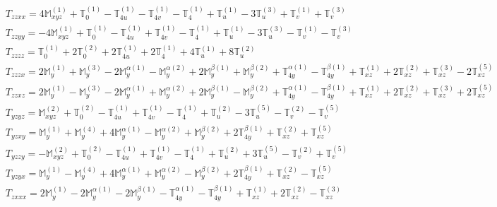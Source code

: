 \documentclass[fleqn,8pt,landscape]{jsarticle}
\begin{document}
\begin{align*}
& T_{zzxx} = 4 \mathbb{M}_{xyz}^{(1)} + \mathbb{T}_{0}^{(1)} - \mathbb{T}_{4u}^{(1)} - \mathbb{T}_{4v}^{(1)} - \mathbb{T}_{4}^{(1)} + \mathbb{T}_{u}^{(1)} - 3 \mathbb{T}_{u}^{(3)} + \mathbb{T}_{v}^{(1)} + \mathbb{T}_{v}^{(3)} \\
& T_{zzyy} = - 4 \mathbb{M}_{xyz}^{(1)} + \mathbb{T}_{0}^{(1)} - \mathbb{T}_{4u}^{(1)} + \mathbb{T}_{4v}^{(1)} - \mathbb{T}_{4}^{(1)} + \mathbb{T}_{u}^{(1)} - 3 \mathbb{T}_{u}^{(3)} - \mathbb{T}_{v}^{(1)} - \mathbb{T}_{v}^{(3)} \\
& T_{zzzz} = \mathbb{T}_{0}^{(1)} + 2 \mathbb{T}_{0}^{(2)} + 2 \mathbb{T}_{4u}^{(1)} + 2 \mathbb{T}_{4}^{(1)} + 4 \mathbb{T}_{u}^{(1)} + 8 \mathbb{T}_{u}^{(2)} \\
& T_{zzzx} = 2 \mathbb{M}_{y}^{(1)} + \mathbb{M}_{y}^{(3)} - 2 \mathbb{M}_{y}^{\alpha(1)} - \mathbb{M}_{y}^{\alpha(2)} + 2 \mathbb{M}_{y}^{\beta(1)} + \mathbb{M}_{y}^{\beta(2)} + \mathbb{T}_{4y}^{\alpha(1)} - \mathbb{T}_{4y}^{\beta(1)} + \mathbb{T}_{xz}^{(1)} + 2 \mathbb{T}_{xz}^{(2)} + \mathbb{T}_{xz}^{(3)} - 2 \mathbb{T}_{xz}^{(5)} \\
& T_{zzxz} = 2 \mathbb{M}_{y}^{(1)} - \mathbb{M}_{y}^{(3)} - 2 \mathbb{M}_{y}^{\alpha(1)} + \mathbb{M}_{y}^{\alpha(2)} + 2 \mathbb{M}_{y}^{\beta(1)} - \mathbb{M}_{y}^{\beta(2)} + \mathbb{T}_{4y}^{\alpha(1)} - \mathbb{T}_{4y}^{\beta(1)} + \mathbb{T}_{xz}^{(1)} + 2 \mathbb{T}_{xz}^{(2)} + \mathbb{T}_{xz}^{(3)} + 2 \mathbb{T}_{xz}^{(5)} \\
& T_{yzyz} = \mathbb{M}_{xyz}^{(2)} + \mathbb{T}_{0}^{(2)} - \mathbb{T}_{4u}^{(1)} + \mathbb{T}_{4v}^{(1)} - \mathbb{T}_{4}^{(1)} + \mathbb{T}_{u}^{(2)} - 3 \mathbb{T}_{u}^{(5)} - \mathbb{T}_{v}^{(2)} - \mathbb{T}_{v}^{(5)} \\
& T_{yzxy} = \mathbb{M}_{y}^{(1)} + \mathbb{M}_{y}^{(4)} + 4 \mathbb{M}_{y}^{\alpha(1)} - \mathbb{M}_{y}^{\alpha(2)} + \mathbb{M}_{y}^{\beta(2)} + 2 \mathbb{T}_{4y}^{\beta(1)} + \mathbb{T}_{xz}^{(2)} + \mathbb{T}_{xz}^{(5)} \\
& T_{yzzy} = - \mathbb{M}_{xyz}^{(2)} + \mathbb{T}_{0}^{(2)} - \mathbb{T}_{4u}^{(1)} + \mathbb{T}_{4v}^{(1)} - \mathbb{T}_{4}^{(1)} + \mathbb{T}_{u}^{(2)} + 3 \mathbb{T}_{u}^{(5)} - \mathbb{T}_{v}^{(2)} + \mathbb{T}_{v}^{(5)} \\
& T_{yzyx} = \mathbb{M}_{y}^{(1)} - \mathbb{M}_{y}^{(4)} + 4 \mathbb{M}_{y}^{\alpha(1)} + \mathbb{M}_{y}^{\alpha(2)} - \mathbb{M}_{y}^{\beta(2)} + 2 \mathbb{T}_{4y}^{\beta(1)} + \mathbb{T}_{xz}^{(2)} - \mathbb{T}_{xz}^{(5)} \\
& T_{zxxx} = 2 \mathbb{M}_{y}^{(1)} - 2 \mathbb{M}_{y}^{\alpha(1)} - 2 \mathbb{M}_{y}^{\beta(1)} - \mathbb{T}_{4y}^{\alpha(1)} - \mathbb{T}_{4y}^{\beta(1)} + \mathbb{T}_{xz}^{(1)} + 2 \mathbb{T}_{xz}^{(2)} - \mathbb{T}_{xz}^{(3)} \\

\end{align*}
\end{document}
